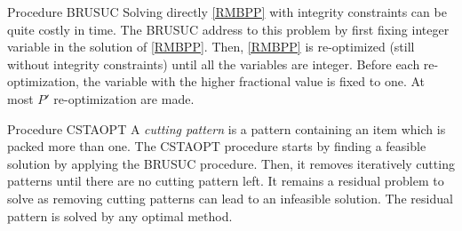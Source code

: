 \begin{paragraph}{Procedure BRUSUC}
	Solving directly \eqref{RMBPP} with integrity constraints can be quite costly in time. The BRUSUC address to this problem by first fixing integer variable in the solution of \eqref{RMBPP}. Then, \eqref{RMBPP} is re-optimized (still without integrity constraints) until all the variables are integer. Before each re-optimization, the variable with the higher fractional value is fixed to one. At most $P'$ re-optimization are made.
\end{paragraph}

\begin{paragraph}{Procedure CSTAOPT}
	A \textit{cutting pattern} is a pattern containing an item which is packed more than one. The CSTAOPT procedure starts by finding a feasible solution by applying the BRUSUC procedure. Then, it removes iteratively cutting patterns until there are no cutting pattern left. It remains a residual problem to solve as removing cutting patterns can lead to an infeasible solution. The residual pattern is solved by any optimal method.
\end{paragraph}
